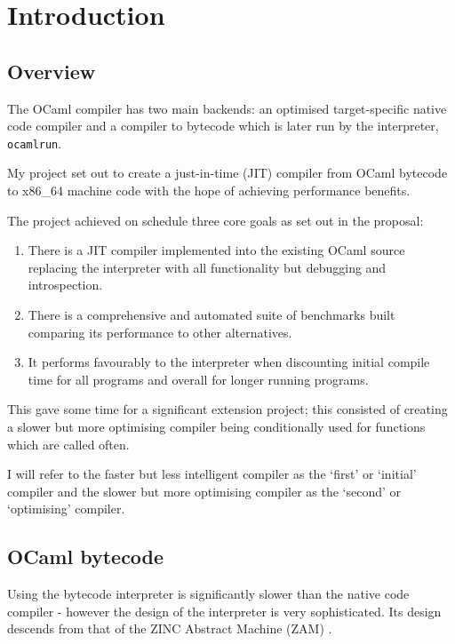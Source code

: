 \chapter{Introduction}

\section{Overview}

The OCaml compiler has two main backends: an optimised target-specific native code compiler and a
compiler to bytecode which is later run by the interpreter, \texttt{ocamlrun}.

My project set out to create a just-in-time (JIT) compiler from OCaml bytecode to x86\_64 machine
code with the hope of achieving performance benefits.

The project achieved on schedule three core goals as set out in the proposal:

\begin{enumerate}
    \item There is a JIT compiler implemented into the existing OCaml source
          replacing the interpreter with all functionality but debugging
          and introspection.
    \item There is a comprehensive and automated suite of benchmarks built
          comparing its performance to other alternatives.
    \item It performs favourably to the interpreter when discounting
          initial compile time for all programs and overall for longer running
          programs.
\end{enumerate}

This gave some time for a significant extension project; this consisted of creating a slower but
more optimising compiler being conditionally used for functions which are called often.

I will refer to the faster but less intelligent compiler as the `first' or `initial' compiler and
the slower but more optimising compiler as the `second' or `optimising' compiler.

\section{OCaml bytecode}

Using the bytecode interpreter is significantly slower than the native code compiler - however
the design of the interpreter is very sophisticated. Its design descends from that of the ZINC
Abstract Machine (ZAM) \cite{zinc}.

